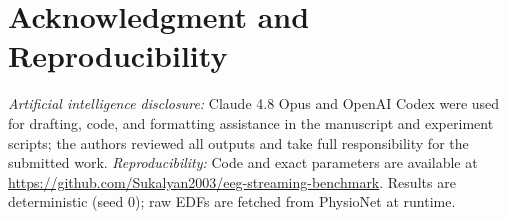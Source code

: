 \documentclass[conference]{IEEEtranSPMB}
\begin{document}
\section*{Acknowledgment and Reproducibility}
\textit{Artificial intelligence disclosure:} Claude 4.8 Opus and OpenAI Codex were used for
drafting, code, and formatting assistance in the manuscript and experiment scripts; the authors
reviewed all outputs and take full responsibility for the submitted work. \textit{Reproducibility:}
Code and exact parameters are available at
\url{https://github.com/Sukalyan2003/eeg-streaming-benchmark}. Results are deterministic (seed 0);
raw EDFs are fetched from PhysioNet at runtime.

\setlength{\bibsep}{2.5pt plus 0ex}
\footnotesize



\label{LastPage}
\end{document}
